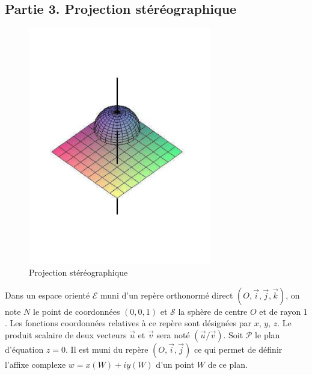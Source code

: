 \subsection*{Partie 3. Projection stéréographique}
\begin{figure}[ht]
 \centering
 \includegraphics[width=8cm]{Ericatti_1.pdf}
 \caption{Projection stéréographique}
 \label{fig:Ericatti_1}
\end{figure}
Dans un espace orienté $\mathcal E$ muni d'un repère orthonormé direct $(O,\overrightarrow i,\overrightarrow j,\overrightarrow k)$, on note $N$ le point de coordonnées $(0,0,1)$ et $\mathcal S$ la sphère de centre $O$ et de rayon $1$.\newline
Les fonctions coordonnées relatives à ce repère sont désignées par $x$, $y$, $z$. Le produit scalaire de deux vecteurs $\overrightarrow u$ et $\overrightarrow v$ sera noté  $(\overrightarrow u / \overrightarrow v)$.\newline
Soit $\mathcal P$ le plan d'équation $z=0$. Il est muni du repère $(O,\overrightarrow i,\overrightarrow j)$ ce qui permet de définir l'affixe complexe $w=x(W)+iy(W)$ d'un point $W$ de ce plan.
